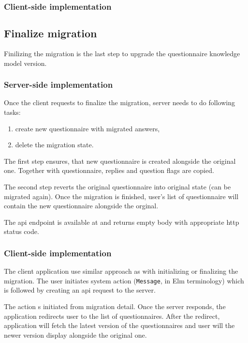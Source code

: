 \subsubsection*{Client-side implementation}

\subsection{Finalize migration}

Finilizing the migration is the last step to upgrade the questionnaire knowledge model version.

\subsubsection*{Server-side implementation}

Once the client requests to finalize the migration, server needs to do following tasks:

\begin{enumerate}
    \item create new questionnaire with migrated answers,
    \item delete the migration state.
\end{enumerate}

The first step ensures, that new questionnaire is created alongside the original one.
Together with questionnaire, replies and question flags are copied.

The second step reverts the original questionnaire into original state (can be migrated again).
Once the migration is finished, user's list of questionnaire will contain the new questionnaire alongside the orginal.

The \gls{api} endpoint is available at  and returns empty body with appropriate \gls{http} status code.

\subsubsection*{Client-side implementation}

The client application use similar approach as with initializing or finalizing the migration.
The user initiates system action (\texttt{Message}, in Elm terminology) which is followed by creating an \gls{api} request to the server.

The action s initiated from migration detail.
Once the server responds, the application redirects user to the list of questionnaires.
After the redirect, application will fetch the latest version of the questionnaires and user will the newer version display alongside the original one.
